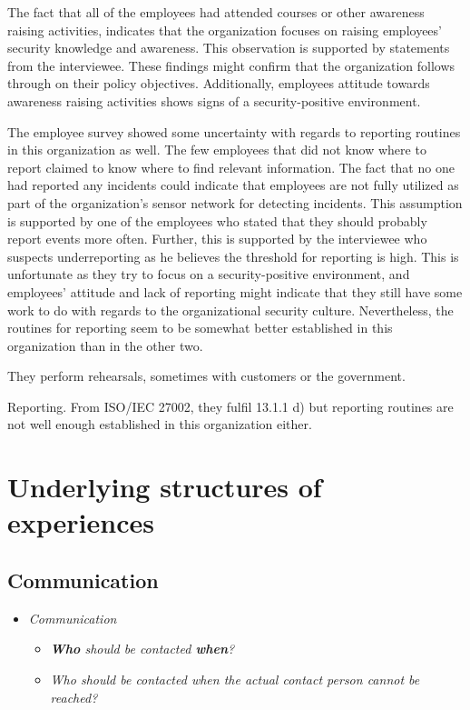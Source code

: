 The fact that all of the employees had attended courses or other awareness raising activities, indicates that the organization focuses on raising employees' security knowledge and awareness. This observation is supported by statements from the interviewee. These findings might confirm that the organization follows through on their policy objectives. Additionally, employees attitude towards awareness raising activities shows signs of a security-positive environment.  
 
The employee survey showed some uncertainty with regards to reporting routines in this organization as well. The few employees that did not know where to report claimed to know where to find relevant information. The fact that no one had reported any incidents could indicate that employees are not fully utilized as part of the organization's sensor network for detecting incidents. This assumption is supported by one of the employees who stated that they should probably report events more often. Further, this is supported by the interviewee who suspects underreporting as he believes the threshold for reporting is high. This is unfortunate as they try to focus on a security-positive environment, and employees' attitude and lack of reporting might indicate that they still have some work to do with regards to the organizational security culture. Nevertheless, the routines for reporting seem to be somewhat better established in this organization than in the other two. 



They perform rehearsals, sometimes with customers or the government.


Reporting. From ISO/IEC 27002, they fulfil 13.1.1 d) but reporting routines are not well enough established in this organization either.


\section{Underlying structures of experiences}
\subsection{Communication}
\begin{itemize}
\item \textit{Communication}
\begin{itemize}
\item \textit{\textbf{Who} should be contacted \textbf{when}?}
\item \textit{Who should be contacted when the actual contact person cannot be reached?}
\end{itemize}
\end{itemize}

